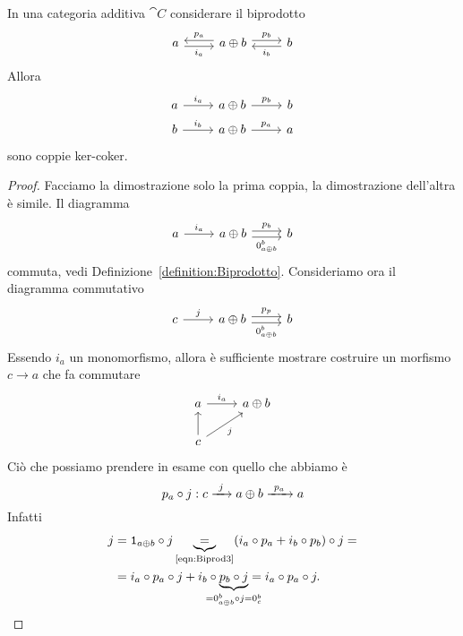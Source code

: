 \begin{lemma}\label{lemma:KerCokerInjProj}
  In una categoria additiva \(\cat C\) considerare il biprodotto
  \[
    \begin{tikzcd}
      a \ar["{i_a}", r, shift right, swap] & a \oplus b \ar["{p_a}",
      l, shift right, swap] \ar["{p_b}", r, shift left] & b
      \ar["{i_b}", l, shift left]
    \end{tikzcd}
  \]
  Allora
  \[
    \begin{tikzcd}[row sep=tiny]
      a \ar["{i_a}", r] & a \oplus b \ar["{p_b}", r] & b \\
      b \ar["{i_b}", r] & a \oplus b \ar["{p_a}", r] & a
    \end{tikzcd}
  \]
  sono coppie ker-coker.
\end{lemma}

\begin{proof}
  Facciamo la dimostrazione solo la prima coppia, la dimostrazione
  dell'altra è simile. Il diagramma
  \[
    \begin{tikzcd}
      a \ar["{i_a}", r] & a \oplus b \ar["{p_b}", r, shift left]
      \ar["{0_{a \oplus b}^b}", r, shift right, swap] & b
    \end{tikzcd}
  \]
  commuta, vedi Definizione~\ref{definition:Biprodotto}. Consideriamo
  ora il diagramma commutativo
  \[
    \begin{tikzcd}
      c \ar["{j}", r] & a \oplus b \ar["{p_p}", r, shift left]
      \ar["{0_{a \oplus b}^b}", r, shift right, swap] & b
    \end{tikzcd}
  \]
  Essendo \(i_a\) un monomorfismo, allora è sufficiente mostrare
  costruire un morfismo \(c \to a\) che fa commutare
  \[
    \begin{tikzcd}
      a \ar["{i_a}",r] & a \oplus b \\
      c \ar[u] \ar["{j}", ur, swap]
    \end{tikzcd}
  \]
  Ciò che possiamo prendere in esame con quello che abbiamo è
  \[
    p_a \circ j : c \xrightarrow{\ j\ } a \oplus b \xrightarrow{\ p_a\ } a
  \]
  Infatti
  \begin{align*}
    j &= \id_{a \oplus b} \circ j \underbrace{=}_{\text{\eqref{eqn:Biprod3}}}
        (i_a \circ p_a + i_b \circ p_b) \circ j = \\
      &= i_a \circ p_a \circ j + i_b \circ \underbrace{p_b \circ j}_{\mathclap{\cramped{= 0_{a \oplus b}^b
        \circ j = 0_c^b}}} = i_a \circ p_a \circ j . \qedhere
  \end{align*}
\end{proof}

